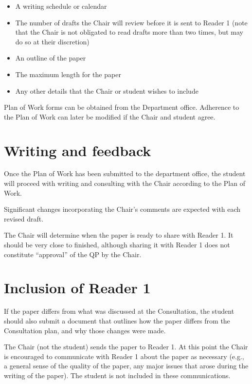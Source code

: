 \documentclass[
]{book}
\providecommand{\tightlist}{%
  \setlength{\itemsep}{0pt}\setlength{\parskip}{0pt}}
\begin{document}
\begin{itemize}
\tightlist
\item
  A writing schedule or calendar
\item
  The number of drafts the Chair will review before it is sent to Reader 1 (note that the Chair is not obligated to read drafts more than two times, but may do so at their discretion)
\item
  An outline of the paper
\item
  The maximum length for the paper
\item
  Any other details that the Chair or student wishes to include
\end{itemize}

Plan of Work forms can be obtained from the Department office. Adherence to the Plan of Work can later be modified if the Chair and student agree.

\section{Writing and feedback}\label{feedback}

Once the Plan of Work has been submitted to the department office, the student will proceed with writing and consulting with the Chair according to the Plan of Work.

Significant changes incorporating the Chair's comments are expected with each revised draft.

The Chair will determine when the paper is ready to share with Reader 1. It should be very close to finished, although sharing it with Reader 1 does not constitute ``approval'' of the QP by the Chair.

\section{Inclusion of Reader 1}\label{reader1}

If the paper differs from what was discussed at the Consultation, the student should also submit a document that outlines how the paper differs from the Consultation plan, and why those changes were made.

The Chair (not the student) sends the paper to Reader 1. At this point the Chair is encouraged to communicate with Reader 1 about the paper as necessary (e.g., a general sense of the quality of the paper, any major issues that arose during the writing of the paper). The student is not included in these communications.
\end{document}
